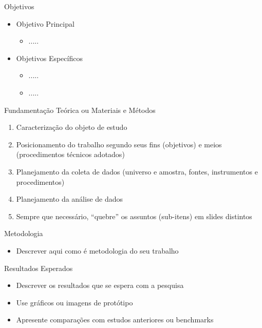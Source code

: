 \documentclass{beamer}
\begin{document}
\begin{frame}{Objetivos}
    \small
    \begin{itemize}
        \item Objetivo Principal
        \begin{itemize}
            \item .....
        \end{itemize}
        \item Objetivos Específicos
        \begin{itemize}
            \item .....
            \item .....
        \end{itemize}
    \end{itemize}  
\end{frame}

\begin{frame}{Fundamentação Teórica ou Materiais e Métodos}
    \small
    \begin{enumerate}
        \item Caracterização do objeto de estudo
        \item Posicionamento do trabalho segundo seus fins (objetivos) e meios (procedimentos técnicos adotados)
        \item Planejamento da coleta de dados (universo e amostra, fontes, instrumentos e procedimentos)
        \item Planejamento da análise de dados
        \item Sempre que necessário, “quebre” os assuntos (sub-itens) em slides distintos
    \end{enumerate}
\end{frame}

\begin{frame}{Metodologia}
    \small
    \begin{itemize}
        \item Descrever aqui como é metodologia do seu trabalho
    \end{itemize}
\end{frame}

\begin{frame}{Resultados Esperados}
    \begin{itemize}
        \item Descrever os resultados que se espera com a pesquisa
        \item Use gráficos ou imagens de protótipo
        \item Apresente comparações com estudos anteriores ou benchmarks
    \end{itemize}
\end{frame}
\end{document}
